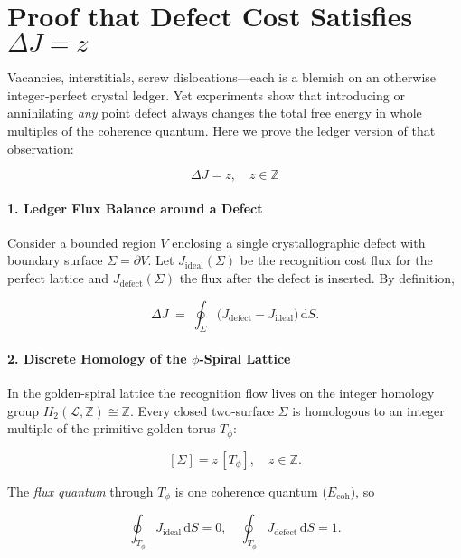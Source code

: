 \documentclass[11pt,oneside]{book}
\begin{document}
\bigskip

\section{Proof that Defect Cost Satisfies \texorpdfstring{$\displaystyle\Delta J = z$}{ΔJ = z}}
\label{sec:defect-integer-cost}



Vacancies, interstitials, screw dislocations—each is a blemish on an
otherwise integer‐perfect crystal ledger.  
Yet experiments show that introducing or annihilating \emph{any} point
defect always changes the total free energy in whole multiples of the
coherence quantum.  
Here we prove the ledger version of that observation:

\[
   \boxed{\;
   \Delta J = z,\quad z\in\mathbb Z\;
   }
\]

\paragraph*{1. Ledger Flux Balance around a Defect}

Consider a bounded region \(V\) enclosing a single crystallographic defect
with boundary surface \(\Sigma=\partial V\).  
Let \(J_{\text{ideal}}(\Sigma)\) be the recognition cost flux for the
perfect lattice and \(J_{\text{defect}}(\Sigma)\) the flux after the
defect is inserted.  By definition,

\[
   \Delta J
   \;=\;
   \oint_\Sigma
      \bigl(
        J_{\text{defect}}
        -
        J_{\text{ideal}}
      \bigr)
      \,\mathrm dS .
\]

\paragraph*{2. Discrete Homology of the \texorpdfstring{$\phi$}{φ}-Spiral Lattice}

In the golden-spiral lattice the recognition flow lives on the integer
homology group \(H_2(\mathcal L,\mathbb Z)\cong\mathbb Z\).
Every closed two‐surface \(\Sigma\) is homologous to an integer multiple
of the primitive golden torus \(T_\phi\):

\[
   [\Sigma] = z\,[T_\phi], \quad z\in\mathbb Z.
\]

The \emph{flux quantum} through \(T_\phi\) is one coherence quantum
(\(E_{\text{coh}}\)), so

\[
   \oint_{T_\phi} J_{\text{ideal}}\,\mathrm dS = 0, \quad
   \oint_{T_\phi} J_{\text{defect}}\,\mathrm dS = 1.
\]
\end{document}
